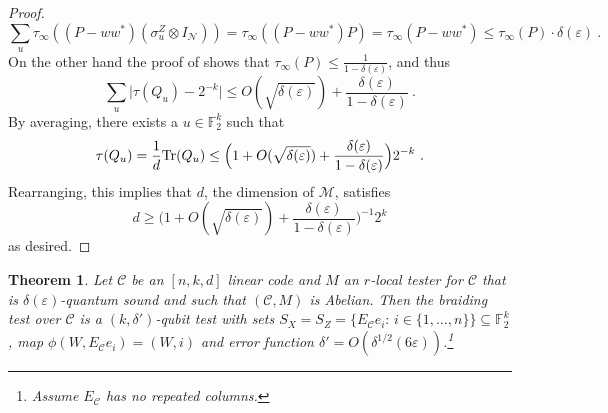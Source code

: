 \documentclass[11pt]{article}
\newtheorem{theorem}{Theorem}[section]
\theoremstyle{definition}
\newcommand{\code}{\mathcal{C}}
\newcommand{\Tr}{\mbox{\rm Tr}}
\newcommand{\field}{\mathbb{F}_2}
\newcommand{\F}{\ensuremath{\mathbb{F}}}
\newcommand{\mM}{\ensuremath{\mathcal{M}}}
\newcommand{\eps}{\varepsilon}
\newcommand{\mN}{\mathcal{N}}
\begin{document}
\begin{proof}
\[
\sum_u \tau_\infty((P - ww^*)(\sigma^Z_u \otimes I_\mN)) = \tau_\infty((P - ww^*) P) = \tau_\infty(P - ww^*) \leq \tau_\infty(P) \cdot \delta(\eps)~.
\]
On the other hand the proof of  shows that $\tau_\infty(P) \leq \frac{1}{1 - \delta(\eps)}$, and thus 
\[
\sum_u \Big| \tau(Q_u) - 2^{-k} \Big| \leq O(\sqrt{\delta(\eps)}) + \frac{\delta(\eps)}{1 - \delta(\eps)}~.
\]
By averaging, there exists a $u \in \F_2^k$ such that
\[
\tau(Q_u) = \frac{1}{d} \Tr(Q_u) \leq  \Big( 1 + O(\sqrt{\delta(\eps)}) + \frac{\delta(\eps)}{1 - \delta(\eps)}\Big) 2^{-k}~.
\]
Rearranging, this implies that $d$, the dimension of $\mM$, satisfies
\[
	d \geq \Big( 1 + O(\sqrt{\delta(\eps)}) + \frac{\delta(\eps)}{1 - \delta(\eps)}\Big)^{-1} 2^k
\]
as desired.
\end{proof}

\begin{theorem}\label{thm:main}
Let $\code$ be an $[n,k,d]$ linear code and $M$ an $r$-local tester for $\code$ that is $\delta(\eps)$-quantum sound and such that $(\code,M)$ is Abelian. Then the braiding test over $\code$ is a $(k,\delta')$-qubit test with sets $S_X=S_Z=\{E_\code e_i:\,i\in\{1,\ldots,n\}\}\subseteq \field^k$, map $\phi(W,E_\code e_i)=(W,i)$ and error function $\delta' = O(\delta^{1/2}(6\eps))$.\footnote{Assume $E_\code$ has no repeated columns.} 
\end{theorem}
\end{document}
